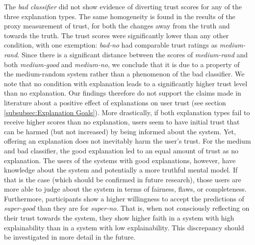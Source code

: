 The \textit{bad classifier} did not show evidence of diverting trust scores for any of the three explanation types. The same homogeneity is found in the results of the proxy measurement of trust, for both the changes away from the truth and towards the truth. The trust scores were significantly lower than any other condition, with one exemption: \textit{bad-no} had comparable trust ratings as \textit{medium-rand}. Since there is a significant distance between the scores of \textit{medium-rand} and both \textit{medium-good} and \textit{medium-no}, we conclude that it is due to a property of the medium-random system rather than a phenomenon of the bad classifier.\newline
We note that no condition with explanation leads to a significantly higher trust level than no explanation. Our findings therefore do not support the claims made in literature about a positive effect of explanations on user trust (see section \ref{subsubsec:Explanation Goals}). More drastically, if both explanation types fail to receive higher scores than no explanation, users seem to have initial trust that can be harmed (but not increased) by being informed about the system. Yet, offering an explanation does not inevitably harm the user's trust. For the medium and bad classifier, the good explanation led to an equal amount of trust as no explanation. The users of the systems with good explanations, however, have knowledge about the system and potentially a more truthful mental model. If that is the case (which should be confirmed in future research), those users are more able to judge about the system in terms of fairness, flaws, or completeness. Furthermore, participants show a higher willingness to accept the predictions of \textit{super-good} than they are for \textit{super-no}. That is, when not consciously reflecting on their trust towards the system, they show higher faith in a system with high explainability than in a system with low explainability. This discrepancy should be investigated in more detail in the future.\newline
